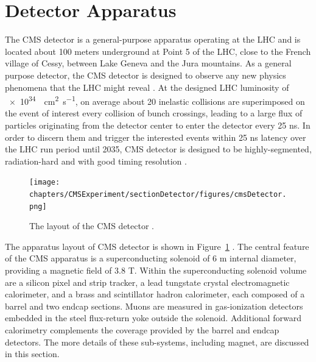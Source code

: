 

\section{Detector Apparatus}
\label{sec:cmsexperiment:detector}



The CMS \cite{exhep:cms:Chatrchyan:2008aa} detector is a general-purpose apparatus operating at the LHC and is located about 100 meters underground at Point 5 of the LHC, close to the French village of Cessy, between Lake Geneva and the Jura mountains. As a general purpose detector, the CMS detector is designed to observe any new physics phenomena that the LHC might reveal \cite{cms:tdr2:Ball:2007zza}. At the designed LHC luminosity of \SI{e34}{\per\cm\squared \per\s}, on average about 20 inelastic collisions are superimposed on the event of interest every collision of bunch crossings, leading to a large flux of particles originating from the detector center to enter the detector every 25 ns. In order to discern them and trigger the interested events within 25 ns latency over the LHC run period until 2035, CMS detector is designed to be highly-segmented, radiation-hard and with good timing resolution \cite{exhep:cms:Chatrchyan:2008aa}.

\begin{figure}[ht]
    \centering
    \texttt{[image: chapters/CMSExperiment/sectionDetector/figures/cmsDetector.png]}
    \caption{The layout of the CMS detector \cite{cms:detectorOverview}.}
    \label{fig:cmsexperiment:detector:detectorOverview}
\end{figure}

The apparatus layout of CMS detector is shown in Figure~\ref{fig:cmsexperiment:detector:detectorOverview} \cite{cms:detectorOverview}. The central feature of the CMS apparatus is a superconducting solenoid of 6 m internal diameter, providing a magnetic field of 3.8 T. Within the superconducting solenoid volume are a silicon pixel and strip tracker, a lead tungstate crystal electromagnetic calorimeter, and a brass and scintillator hadron calorimeter, each composed of a barrel and two endcap sections. Muons are measured in gas-ionization detectors embedded in the steel flux-return yoke outside the solenoid. Additional forward calorimetry complements the coverage provided by the barrel and endcap detectors. The more details of these sub-systems, including magnet,  are discussed in this section. 

